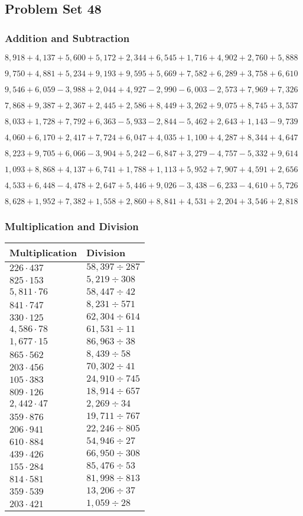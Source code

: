 \hypertarget{problem-set-48-2}{%
\subsection{Problem Set 48}\label{problem-set-48-2}}

\hypertarget{addition-and-subtraction-210}{%
\subsubsection{Addition and
Subtraction}\label{addition-and-subtraction-210}}

\(8,918+4,137+5,600+5,172+2,344+6,545+1,716+4,902+2,760+ 5,888\)

\(9,750+4,881+5,234+9,193+9,595+5,669+7,582+6,289+3,758+6,610\)

\(9,546+6,059-3,988+2,044+4,927-2,990-6,003-2,573+7,969+7,326\)

\(7,868+9,387+2,367+2,445+2,586+8,449+3,262+9,075+8,745+3,537\)

\(8,033+1,728+7,792+6,363-5,933-2,844-5,462+2,643+1,143-9,739\)

\(4,060+6,170+2,417+7,724+6,047+4,035+1,100+4,287+8,344+4,647\)

\(8,223+9,705+6,066-3,904+5,242-6,847+3,279-4,757-5,332+9,614\)

\(1,093+8,868+4,137+6,741+1,788+1,113+5,952+7,907+4,591+2,656\)

\(4,533+6,448-4,478+2,647+5,446+9,026-3,438-6,233-4,610+5,726\)

\(8,628+1,952+7,382+1,558+2,860+8,841+4,531+2,204+3,546+2,818\)

\hypertarget{multiplication-and-division-209}{%
\subsubsection{Multiplication and
Division}\label{multiplication-and-division-209}}

\begin{longtable}[]{@{}ll@{}}
\toprule
Multiplication & Division\tabularnewline
\midrule
\endhead
\(226\cdot437\) & \(58,397÷287\)\tabularnewline
\(825\cdot153\) & \(5,219÷308\)\tabularnewline
\(5,811\cdot76\) & \(58,447÷42\)\tabularnewline
\(841\cdot747\) & \(8,231÷571\)\tabularnewline
\(330\cdot125\) & \(62,304÷614\)\tabularnewline
\(4,586\cdot78\) & \(61,531÷11\)\tabularnewline
\(1,677\cdot15\) & \(86,963÷38\)\tabularnewline
\(865\cdot562\) & \(8,439÷58\)\tabularnewline
\(203\cdot456\) & \(70,302÷41\)\tabularnewline
\(105\cdot383\) & \(24,910÷745\)\tabularnewline
\(809\cdot126\) & \(18,914÷657\)\tabularnewline
\(2,442\cdot47\) & \(2,269÷34\)\tabularnewline
\(359\cdot876\) & \(19,711÷767\)\tabularnewline
\(206\cdot941\) & \(22,246÷805\)\tabularnewline
\(610\cdot884\) & \(54,946÷27\)\tabularnewline
\(439\cdot426\) & \(66,950÷308\)\tabularnewline
\(155\cdot284\) & \(85,476÷53\)\tabularnewline
\(814\cdot581\) & \(81,998÷813\)\tabularnewline
\(359\cdot539\) & \(13,206÷37\)\tabularnewline
\(203\cdot421\) & \(1,059÷28\)\tabularnewline
\bottomrule
\end{longtable}

